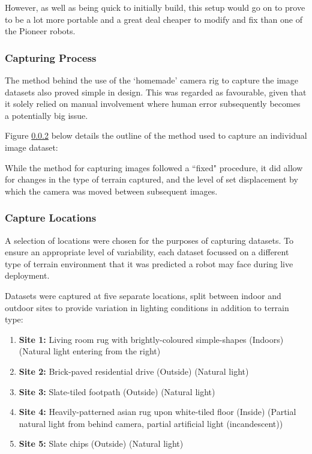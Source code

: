 However, as well as being quick to initially build, this setup would go on to prove to be a lot more portable and a great deal cheaper to modify and fix than one of the Pioneer robots. 


\subsubsection{Capturing Process}

The method behind the use of the `homemade' camera rig to capture the image datasets also proved simple in design. This was regarded as favourable, given that it solely relied on manual involvement where human error subsequently becomes a potentially big issue. 

Figure \ref{} below details the outline of the method used to capture an individual image dataset:


While the method for capturing images followed a ``fixed" procedure, it did allow for changes in the type of terrain captured, and the level of set displacement by which the camera was moved between subsequent images.

\subsubsection{Capture Locations}

A selection of locations were chosen for the purposes of capturing datasets. To ensure an appropriate level of variability, each dataset focussed on a different type of terrain environment that it was predicted a robot may face during live deployment.

Datasets were captured at five separate locations, split between indoor and outdoor sites to provide variation in lighting conditions in addition to terrain type:

\begin{enumerate}
	\item \textbf{Site 1:} Living room rug with brightly-coloured simple-shapes (Indoors) (Natural light entering from the right)
	\item \textbf{Site 2:} Brick-paved residential drive (Outside) (Natural light)
	\item \textbf{Site 3:} Slate-tiled footpath (Outside) (Natural light)
	\item \textbf{Site 4:} Heavily-patterned asian rug upon white-tiled floor (Inside) (Partial natural light from behind camera, partial artificial light (incandescent))
	\item \textbf{Site 5:} Slate chips (Outside) (Natural light)
\end{enumerate}

